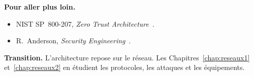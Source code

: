 \bigskip

\begin{boxinfo}
\textbf{Pour aller plus loin.}
\begin{itemize}
    \item NIST SP~800-207, \emph{Zero Trust Architecture}~\cite{nist800207}.
    \item R.~Anderson, \emph{Security Engineering}~\cite{anderson2020}.
\end{itemize}
\end{boxinfo}

\begin{boxinfo}
\textbf{Transition.} L'architecture repose sur le réseau. Les
Chapitres~\ref{chap:reseaux1} et~\ref{chap:reseaux2} en étudient les
protocoles, les attaques et les équipements.
\end{boxinfo}
